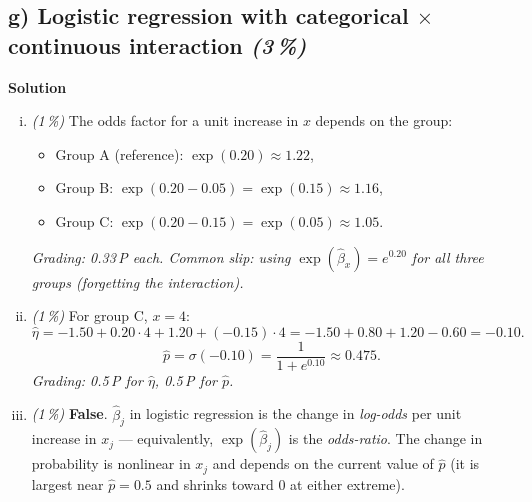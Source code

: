\documentclass[11pt,a4paper]{article}
\newcommand{\subpoints}[1]{\textit{(#1\,\%)}}
\newcommand{\sol}{\noindent\textbf{Solution}}
\begin{document}
\subsection*{g) Logistic regression with categorical $\times$ continuous interaction \subpoints{3}}
\sol{}
\begin{enumerate}[(i)]
  \item \subpoints{1} The odds factor for a unit increase in $x$ depends on the group:
        \begin{itemize}
          \item Group A (reference): $\exp(0.20) \approx \boxed{1.22}$,
          \item Group B: $\exp(0.20 - 0.05) = \exp(0.15) \approx \boxed{1.16}$,
          \item Group C: $\exp(0.20 - 0.15) = \exp(0.05) \approx \boxed{1.05}$.
        \end{itemize}
        \emph{Grading: 0.33\,P each. Common slip: using $\exp(\hat\beta_x) = e^{0.20}$ for all
        three groups (forgetting the interaction).}

  \item \subpoints{1} For group C, $x = 4$:
        $$\hat\eta = -1.50 + 0.20\cdot 4 + 1.20 + (-0.15)\cdot 4 = -1.50 + 0.80 + 1.20 - 0.60 = -0.10.$$
        $$\hat p = \sigma(-0.10) = \frac{1}{1 + e^{0.10}} \approx \boxed{0.475}.$$
        \emph{Grading: 0.5\,P for $\hat\eta$, 0.5\,P for $\hat p$.}

  \item \subpoints{1} \textbf{False}. $\hat\beta_j$ in logistic regression is the change in
        \emph{log-odds} per unit increase in $x_j$ --- equivalently, $\exp(\hat\beta_j)$ is the
        \emph{odds-ratio}. The change in probability is nonlinear in $x_j$ and depends on the
        current value of $\hat p$ (it is largest near $\hat p = 0.5$ and shrinks toward $0$ at
        either extreme).
\end{enumerate}
\end{document}
